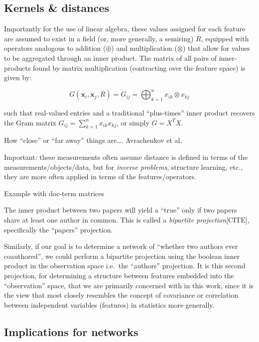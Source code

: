 \documentclass[%
	12pt,
		oneside,
		letterpaper
]{book}
\begin{document}
\subsection{Kernels \& distances}\label{kernels-distances}

Importantly for the use of linear algebra, these values assigned for
each feature are assumed to exist in a field (or, more generally, a
semiring) \(R\), equipped with operators analogous to addition
(\(\oplus\)) and multiplication (\(\otimes\)) that allow for values to
be aggregated through an inner product. The matrix of all pairs of
inner-products found by matrix multiplication (contracting over the
feature space) is given by:

\[G(\mathbf{x}_i, \mathbf{x}_j,R) = G_{ij} = \bigoplus_{k=1}^{n} x_{ik} \otimes x_{kj} \]

such that real-valued entries and a traditional ``plus-times'' inner
product recovers the Gram matrix \(G_{ij}=\sum_{k=1}^{n} x_{ik}x_{kj}\),
or simply \(G=X^TX\).

How ``close'' or ``far away'' things are\ldots. Avrachenkov et al.~

Important: these measurements often assume distance is defined in terms
of the measurements/objects/data, but for \emph{inverse problems},
structure learning, etc., they are more often applied in terms of the
features/operators.

Example with doc-term matrices

The inner product between two papers will yield a ``true'' only if two
papers share at least one author in common. This is called a
\emph{bipartite projection}{[}CITE{]}, specifically the ``papers''
projection.

Similarly, if our goal is to determine a network of ``whether two
authors ever coauthored'', we could perform a bipartite projection using
the boolean inner product in the observation space i.e.~the ``authors''
projection. It is this second projection, for determining a structure
between features embedded into the ``observation'' space, that we are
primarily concerned with in this work, since it is the view that most
closely resembles the concept of covariance or correlation between
independent variables (features) in statistics more generally.

\subsection{Implications for networks}\label{implications-for-networks}
\end{document}
